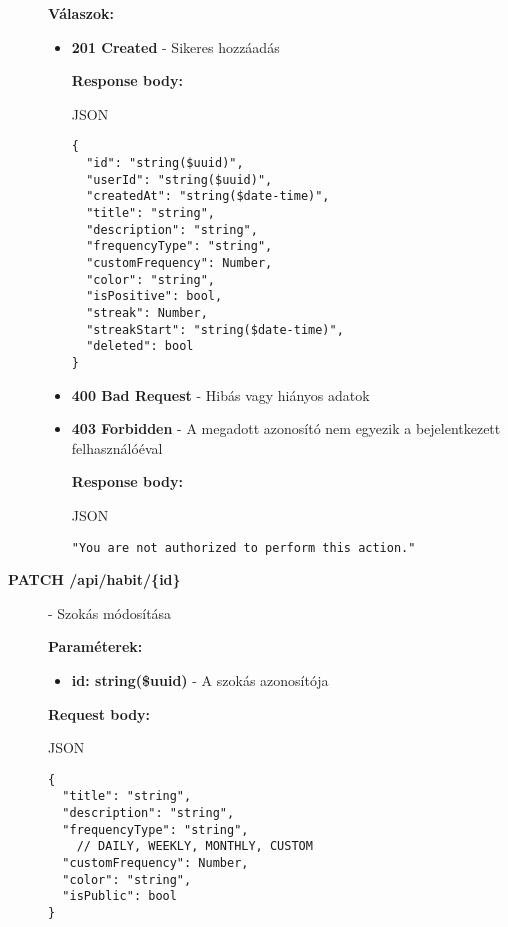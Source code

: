 \documentclass[12pt]{report}
\begin{document}
\begin{description}
    \vspace{0.5cm}
    \textbf{Válaszok:}
    \begin{itemize}
      \item \textbf{201 Created} - Sikeres hozzáadás

        \textbf{Response body:}
        \begin{codeblock}{JSON}
          \begin{verbatim}
{
  "id": "string($uuid)",
  "userId": "string($uuid)",
  "createdAt": "string($date-time)",
  "title": "string",
  "description": "string",
  "frequencyType": "string",
  "customFrequency": Number,
  "color": "string",
  "isPositive": bool,
  "streak": Number,
  "streakStart": "string($date-time)",
  "deleted": bool
}
          \end{verbatim}
        \end{codeblock}

      \item \textbf{400 Bad Request} - Hibás vagy hiányos adatok
      \item \textbf{403 Forbidden} - A megadott azonosító nem egyezik a bejelentkezett felhasználóéval
      
        \textbf{Response body:}
        \begin{codeblock}{JSON}
          \begin{verbatim}
"You are not authorized to perform this action."
          \end{verbatim}
        \end{codeblock}
    \end{itemize}

  \item[\textbf{PATCH /api/habit/\{id\}}] - Szokás módosítása
  
    \vspace{0.5cm}
    \textbf{Paraméterek:}
    \begin{itemize}
      \item \textbf{id: string(\$uuid)} - A szokás azonosítója
    \end{itemize}

    \vspace{0.5cm}
    \textbf{Request body:}
    \begin{codeblock}{JSON}
      \begin{verbatim}
{
  "title": "string",
  "description": "string",
  "frequencyType": "string",
    // DAILY, WEEKLY, MONTHLY, CUSTOM
  "customFrequency": Number,
  "color": "string",
  "isPublic": bool
}
      \end{verbatim}
    \end{codeblock}


\end{description}
\end{document}
